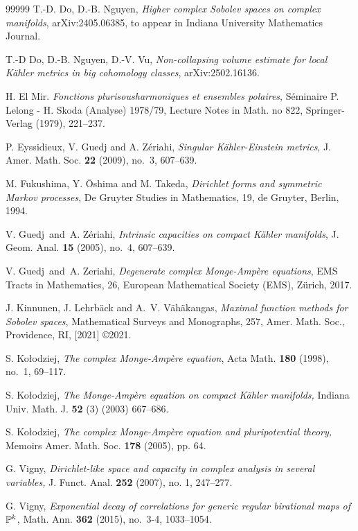 \documentclass{amsart}
\theoremstyle{definition}
\numberwithin{thm}{section}
\numberwithin{equation}{section}
\renewcommand{\[}{\begin{equation}}
\renewcommand{\]}{\end{equation}}
\begin{document}
\begin{thebibliography}{99999}
 T.-D. Do, D.-B. Nguyen, {\it 
Higher complex Sobolev spaces on complex manifolds}, arXiv:2405.06385, to appear  in Indiana University Mathematics Journal.

 T.-D Do, D.-B. Nguyen, D.-V. Vu, {\it 
Non-collapsing volume estimate for local K\"ahler  metrics in big cohomology classes}, arXiv:2502.16136.


 H. El Mir. {\it Fonctions plurisousharmoniques et ensembles polaires}, S\'eminaire P. Lelong - H. Skoda (Analyse) 1978/79, Lecture Notes in Math. no 822, Springer-Verlag (1979), 221--237.

P. Eyssidieux, V. Guedj and A. Z\'eriahi, {\it Singular K\"ahler-Einstein metrics}, J. Amer. Math. Soc. {\bf 22} (2009), no.~3, 607--639.

M. Fukushima, Y. \=Oshima and M. Takeda, {\it Dirichlet forms and symmetric Markov processes}, De Gruyter Studies in Mathematics, 19, de Gruyter, Berlin, 1994.


V. Guedj\ and\ A. Z\'{e}riahi, {\it Intrinsic capacities on compact K\"{a}hler manifolds}, J. Geom. Anal. {\bf 15} (2005), no.~4, 607--639.


 V. Guedj\ and\ A. Zeriahi, {\it Degenerate complex Monge-Amp\`ere equations}, EMS Tracts in Mathematics, 26, European Mathematical Society (EMS), Z\"{u}rich, 2017.


J. Kinnunen, J. Lehrb\"ack and A.~V. V\"ah\"akangas, {\it Maximal function methods for Sobolev spaces}, Mathematical Surveys and Monographs, 257, Amer. Math. Soc., Providence, RI, [2021] \copyright 2021.

S. Ko\l odziej, {\it The complex Monge-Amp\`ere equation}, Acta Math. {\bf 180} (1998), no.~1, 69--117.


 S. Ko\l odziej, {\it The Monge-Amp\`ere equation on compact K\"ahler manifolds,} Indiana Univ. Math. J. {\bf 52} (3) (2003) 667--686.


 S. Ko\l odziej,  {\it The complex Monge-Amp\`ere equation and pluripotential theory,} Memoirs Amer. Math. Soc. {\bf 178} (2005), pp. 64.


 G. Vigny, {\it Dirichlet-like space and capacity in complex analysis in several variables,} J. Funct. Anal. {\bf 252} (2007), no. 1, 247--277.

G. Vigny, {\it Exponential decay of correlations for generic regular birational maps of $\Bbb{P}^k$}, Math. Ann. {\bf 362} (2015), no.~3-4, 1033--1054.



\end{thebibliography}
\end{document}
